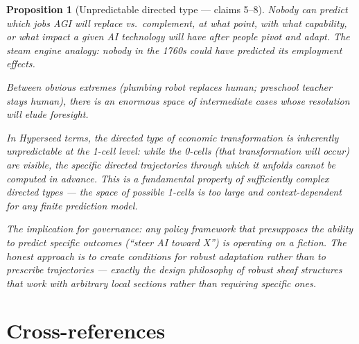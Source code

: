 \documentclass[11pt,a4paper]{article}
\newtheorem{proposition}[definition]{Proposition}
\begin{document}
\begin{proposition}[Unpredictable directed type --- claims 5--8]
\label{prop:predict}
Nobody can predict which jobs AGI will replace vs.\ complement, at what
point, with what capability, or what impact a given AI technology will
have after people pivot and adapt. The steam engine analogy: nobody in
the 1760s could have predicted its employment effects.

Between obvious extremes (plumbing robot replaces human; preschool
teacher stays human), there is an enormous space of intermediate cases
whose resolution will elude foresight.

In Hyperseed terms, the directed type of economic transformation is
\emph{inherently unpredictable} at the 1-cell level: while the 0-cells
(that transformation will occur) are visible, the specific directed
trajectories through which it unfolds cannot be computed in advance.
This is a fundamental property of sufficiently complex directed types
--- the space of possible 1-cells is too large and context-dependent
for any finite prediction model.

The implication for governance: any policy framework that presupposes
the ability to predict specific outcomes (``steer AI toward X'') is
operating on a fiction. The honest approach is to create conditions for
robust adaptation rather than to prescribe trajectories --- exactly
the design philosophy of robust sheaf structures that work with
arbitrary local sections rather than requiring specific ones.
\end{proposition}


\section{Cross-references}
\end{document}
